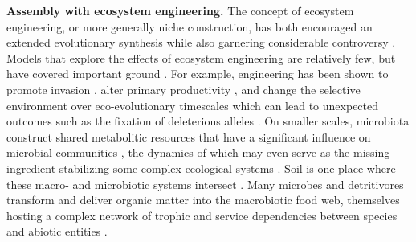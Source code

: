 \documentclass[twocolumn,preprintnumbers,amsmath,amssymb,superscriptaddress,linenumbers]{revtex4-1}
\begin{document}
\vspace{0mm}
\noindent \textbf{Assembly with ecosystem engineering.}
The concept of ecosystem engineering, or more generally niche construction, has both encouraged an extended evolutionary synthesis \cite{Laland2015} while also garnering considerable controversy \cite{Gupta2017,Feldman2017}.
Models that explore the effects of ecosystem engineering are relatively few, but have covered important ground \cite{Hastings2007,OdlingSmee2013}.
For example, engineering has been shown to promote invasion \cite{Cuddington2004}, alter primary productivity \cite{Wright2004}, and change the selective environment over eco-evolutionary timescales \cite{Kylafis2008,Krakauer2009} which can lead to unexpected outcomes such as the fixation of deleterious alleles \cite{Laland1999}.
On smaller scales, microbiota construct shared metabolitic resources that have a significant influence on microbial communities \cite{Kallus2017}, the dynamics of which may even serve as the missing ingredient stabilizing some complex ecological systems \cite{Butler2018}.
Soil is one place where these macro- and microbiotic systems intersect \cite{Amundson2015}.
Many microbes and detritivores transform and deliver organic matter into the macrobiotic food web, themselves hosting a complex network of trophic and service dependencies between species and abiotic entities \cite{Gutierrez2006,Jouquet2006}.
\end{document}
